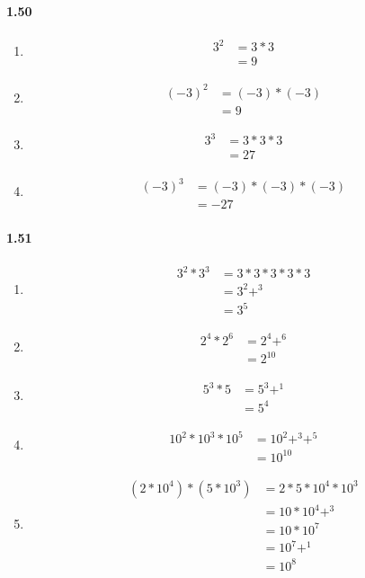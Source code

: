 \documentclass{article}
\newcommand\litem[1]{\item{\bfseries#1\space}}
\begin{document}
\paragraph{1.50}
\begin{enumerate}[label=\emph{\alph*})]
\litem{
\begin{align*}
  3^2 &= 3 * 3 \\
  &= 9
\end{align*}
}
\litem{
\begin{align*}
  (-3)^2 &= (-3) * (-3) \\
  &= 9
\end{align*}
}
\litem{
\begin{align*}
  3^3 &= 3 * 3 * 3 \\
  &= 27
\end{align*}
}
\litem{
\begin{align*}
  (-3)^3 &= (-3) * (-3) * (-3)\\
  &= -27
\end{align*}
}
\end{enumerate}

\paragraph{1.51}
\begin{enumerate}[label=\emph{\alph*})]
\litem{
\begin{align*}
  3^2 * 3^3 &= 3 * 3 * 3 * 3 * 3 \\
  &=3^2+^3 \\
  &= 3^5
\end{align*}
}
\litem{
\begin{align*}
  2^4 * 2^6 &= 2^4+^6 \\
  &= 2^10
\end{align*}
}
\litem{
\begin{align*}
  5^3 * 5 &= 5^3+^1 \\
  &= 5^4
\end{align*}
}
\litem{
\begin{align*}
  10^2 * 10^3 * 10^5 &= 10^2+^3+^5 \\
  &= 10^10
\end{align*}
}
\litem{
\begin{align*}
  (2 * 10^4) * (5 * 10^3) &= 2 * 5 * 10^4 * 10^3 \\
  &= 10 * 10^4+^3 \\
  &= 10 * 10^7 \\
  &= 10^7+^1 \\
  &= 10^8
\end{align*}
}
\end{enumerate}
\end{document}
